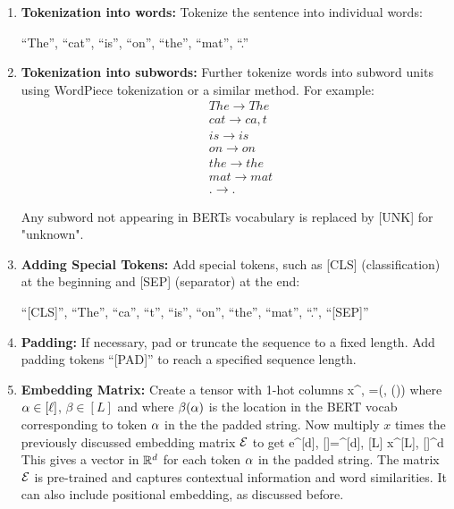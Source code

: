 \begin{enumerate}

  \item \textbf{Tokenization into words:}
       Tokenize the sentence into individual words: 
       
       \enquote{The}, \enquote{cat}, \enquote{is}, \enquote{on}, \enquote{the}, \enquote{mat}, \enquote{.}
  
  \item \textbf{Tokenization into subwords:}
     Further tokenize words into subword units using WordPiece tokenization or a similar method. For example:
         \begin{align*}
           &The \rightarrow The \\
           &cat \rightarrow ca, t \\
           &is \rightarrow is \\
           &on \rightarrow on \\
           &the \rightarrow the \\
           &mat \rightarrow mat \\
           &. \rightarrow .
         \end{align*}
         
         Any subword not appearing in BERTs vocabulary is replaced by [UNK] for "unknown".
  
  \item \textbf{Adding Special Tokens:}
     Add special tokens, such as [CLS] (classification) at the beginning and [SEP] (separator) at the end:
     
      \enquote{[CLS]}, \enquote{The}, \enquote{ca}, \enquote{t}, \enquote{is}, \enquote{on}, \enquote{the}, \enquote{mat}, \enquote{.}, \enquote{[SEP]}
  
  \item \textbf{Padding:}
     If necessary, pad or truncate the sequence to a fixed length. Add  padding tokens \enquote{[PAD]} to reach a specified sequence length.
  
  \item \textbf{Embedding Matrix:}
     Create a
       tensor with 1-hot columns
       \beq x^{\beta, \alp}
       =\delta(\beta, \beta(\alp))
       \eeq
       where $\alpha\in[\ell]$, $\beta\in[L]$ and where $\beta(\alpha)$
       is the location in the
              BERT vocab
       corresponding to token $\alpha$ in the
       the padded string.
       Now multiply $x$ times the previously discussed embedding matrix ${\cal E}$ to get \beq
       e^{[d], [\ell]}=\cale^{[d], [L]}
       x^{[L], [\ell]}\in\RR^{d\times \ell}\eeq
       This gives a vector in ${ \mathbb{R}}^d$
       for each token $\alpha$ in the 
       padded string.
        The matrix ${\cal E}$
        is pre-trained and captures contextual information
        and word similarities. It can also
        include positional embedding, as discussed before. 
\end{enumerate}

